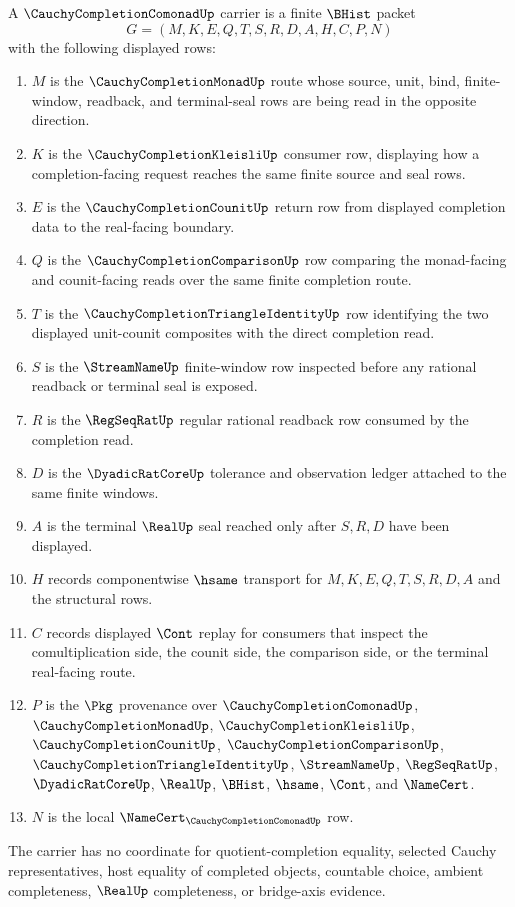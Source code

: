 \begin{definition}
\label{def:cauchy-completion-comonad-carrier}
A $\CauchyCompletionComonadUp$ carrier is a finite $\BHist$ packet
$$
G=(M,K,E,Q,T,S,R,D,A,H,C,P,N)
$$
with the following displayed rows:
\begin{enumerate}
\item $M$ is the $\CauchyCompletionMonadUp$ route whose source, unit, bind, finite-window, readback, and terminal-seal rows are being read in the opposite direction.
\item $K$ is the $\CauchyCompletionKleisliUp$ consumer row, displaying how a completion-facing request reaches the same finite source and seal rows.
\item $E$ is the $\CauchyCompletionCounitUp$ return row from displayed completion data to the real-facing boundary.
\item $Q$ is the $\CauchyCompletionComparisonUp$ row comparing the monad-facing and counit-facing reads over the same finite completion route.
\item $T$ is the $\CauchyCompletionTriangleIdentityUp$ row identifying the two displayed unit-counit composites with the direct completion read.
\item $S$ is the $\StreamNameUp$ finite-window row inspected before any rational readback or terminal seal is exposed.
\item $R$ is the $\RegSeqRatUp$ regular rational readback row consumed by the completion read.
\item $D$ is the $\DyadicRatCoreUp$ tolerance and observation ledger attached to the same finite windows.
\item $A$ is the terminal $\RealUp$ seal reached only after $S,R,D$ have been displayed.
\item $H$ records componentwise $\hsame$ transport for $M,K,E,Q,T,S,R,D,A$ and the structural rows.
\item $C$ records displayed $\Cont$ replay for consumers that inspect the comultiplication side, the counit side, the comparison side, or the terminal real-facing route.
\item $P$ is the $\Pkg$ provenance over $\CauchyCompletionComonadUp$, $\CauchyCompletionMonadUp$, $\CauchyCompletionKleisliUp$, $\CauchyCompletionCounitUp$, $\CauchyCompletionComparisonUp$, $\CauchyCompletionTriangleIdentityUp$, $\StreamNameUp$, $\RegSeqRatUp$, $\DyadicRatCoreUp$, $\RealUp$, $\BHist$, $\hsame$, $\Cont$, and $\NameCert$.
\item $N$ is the local $\NameCert_{\CauchyCompletionComonadUp}$ row.
\end{enumerate}
The carrier has no coordinate for quotient-completion equality, selected Cauchy representatives, host equality of completed objects, countable choice, ambient completeness, $\RealUp$ completeness, or bridge-axis evidence.
\end{definition}

